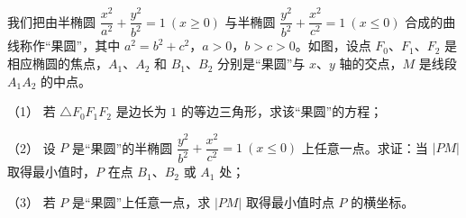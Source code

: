 \begin{question}
我们把由半椭圆 $\dfrac{x^2}{a^2}+\dfrac{y^2}{b^2}=1\ (x\geqslant0)$ 与半椭圆 $\dfrac{y^2}{b^2}+\dfrac{x^2}{c^2}=1\ (x\leqslant0)$ 合成的曲线称作“果圆”，其中 $a^2=b^2+c^2$，$a>0$，$b>c>0$。如图，设点 $F_0$、$F_1$、$F_2$ 是相应椭圆的焦点，$A_1$、$A_2$ 和 $B_1$、$B_2$ 分别是“果圆”与 $x$、$y$ 轴的交点，$M$ 是线段 $A_1A_2$ 的中点。

（1） 若 $\triangle F_0F_1F_2$ 是边长为 $1$ 的等边三角形，求该“果圆”的方程；

（2） 设 $P$ 是“果圆”的半椭圆 $\dfrac{y^2}{b^2}+\dfrac{x^2}{c^2}=1\ (x\leqslant0)$ 上任意一点。求证：当 $|PM|$ 取得最小值时，$P$ 在点 $B_1$、$B_2$ 或 $A_1$ 处；

（3） 若 $P$ 是“果圆”上任意一点，求 $|PM|$ 取得最小值时点 $P$ 的横坐标。
\nopagebreak[4]
\begin{center}\end{center}
\nopagebreak[4]

\end{question}